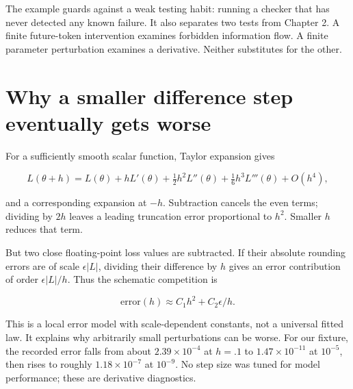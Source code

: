 The example guards against a weak testing habit: running a checker that
has never detected any known failure. It also separates two tests from
Chapter 2. A finite future-token intervention examines forbidden
information flow. A finite parameter perturbation examines a derivative.
Neither substitutes for the other.

\section{Why a smaller difference step eventually gets
worse}\label{why-a-smaller-difference-step-eventually-gets-worse}

For a sufficiently smooth scalar function, Taylor expansion gives

\begin{equation}
L(\theta+h)=L(\theta)+hL'(\theta)+\tfrac12h^2L''(\theta)
+\tfrac16h^3L'''(\theta)+O(h^4),
\end{equation}

and a corresponding expansion at \(-h\). Subtraction cancels the even
terms; dividing by \(2h\) leaves a leading truncation error proportional
to \(h^2\). Smaller \(h\) reduces that term.

But two close floating-point loss values are subtracted. If their
absolute rounding errors are of scale \(\epsilon |L|\), dividing their
difference by \(h\) gives an error contribution of order
\(\epsilon |L|/h\). Thus the schematic competition is

\begin{equation}
\text{error}(h)\approx C_1h^2+C_2\epsilon/h.
\end{equation}

This is a local error model with scale-dependent constants, not a
universal fitted law. It explains why arbitrarily small perturbations
can be worse. For our fixture, the recorded error falls from about
\(2.39\times10^{-4}\) at \(h=.1\) to \(1.47\times10^{-11}\) at
\(10^{-5}\), then rises to roughly \(1.18\times10^{-7}\) at \(10^{-9}\).
No step size was tuned for model performance; these are derivative
diagnostics.


